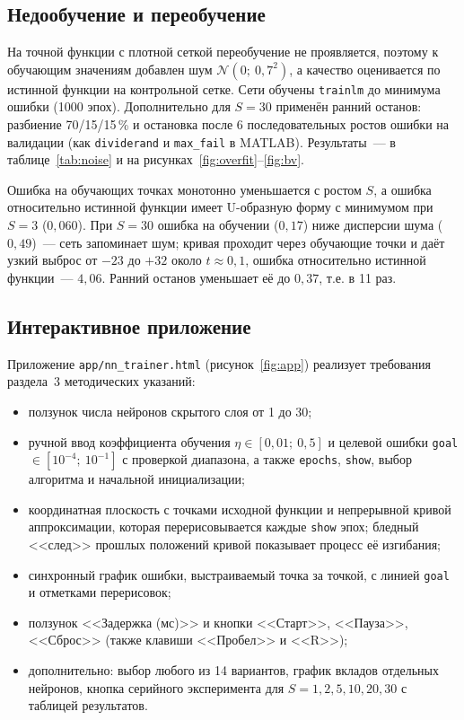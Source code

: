 \documentclass[14pt,a4paper]{extarticle}
\begin{document}
\subsection{Недообучение и переобучение}

На точной функции с плотной сеткой переобучение не проявляется, поэтому к обучающим значениям добавлен шум $\mathcal N(0;\ 0{,}7^2)$, а качество оценивается по истинной функции на контрольной сетке. Сети обучены \texttt{trainlm} до минимума ошибки (1000 эпох). Дополнительно для $S = 30$ применён ранний останов: разбиение 70/15/15\,\% и остановка после 6 последовательных ростов ошибки на валидации (как \texttt{dividerand} и \texttt{max\_fail} в MATLAB). Результаты~--- в таблице~\ref{tab:noise} и на рисунках~\ref{fig:overfit}--\ref{fig:bv}.



Ошибка на обучающих точках монотонно уменьшается с ростом $S$, а ошибка относительно истинной функции имеет U-образную форму с минимумом при $S = 3$ ($0{,}060$). При $S = 30$ ошибка на обучении ($0{,}17$) ниже дисперсии шума ($0{,}49$)~--- сеть запоминает шум; кривая проходит через обучающие точки и даёт узкий выброс от $-23$ до $+32$ около $t \approx 0{,}1$, ошибка относительно истинной функции~--- $4{,}06$. Ранний останов уменьшает её до $0{,}37$, т.е. в 11 раз.

\subsection{Интерактивное приложение}
\label{sec:app}

Приложение \texttt{app/nn\_trainer.html} (рисунок~\ref{fig:app}) реализует требования раздела~3 методических указаний:
\begin{itemize}
\item ползунок числа нейронов скрытого слоя от 1 до 30;
\item ручной ввод коэффициента обучения $\eta \in [0{,}01;\ 0{,}5]$ и целевой ошибки \texttt{goal} $\in [10^{-4};\ 10^{-1}]$ с проверкой диапазона, а также \texttt{epochs}, \texttt{show}, выбор алгоритма и начальной инициализации;
\item координатная плоскость с точками исходной функции и непрерывной кривой аппроксимации, которая перерисовывается каждые \texttt{show} эпох; бледный <<след>> прошлых положений кривой показывает процесс её изгибания;
\item синхронный график ошибки, выстраиваемый точка за точкой, с линией \texttt{goal} и отметками перерисовок;
\item ползунок <<Задержка (мс)>> и кнопки <<Старт>>, <<Пауза>>, <<Сброс>> (также клавиши <<Пробел>> и <<R>>);
\item дополнительно: выбор любого из 14 вариантов, график вкладов отдельных нейронов, кнопка серийного эксперимента для $S = 1, 2, 5, 10, 20, 30$ с таблицей результатов.
\end{itemize}
\end{document}
